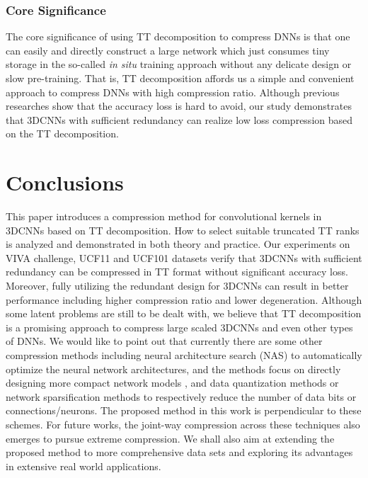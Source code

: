 \documentclass[a4paper,fleqn]{cas-dc}
\begin{document}
\subsubsection{Core Significance}\quad

The core significance of using TT decomposition to compress DNNs is that one can easily and directly construct a large network which just consumes tiny storage in the so-called \emph{in situ} training approach \citep{Alibart_2013_ExInSitu} without any delicate design or slow pre-training. That is, TT decomposition affords us a simple and convenient approach to compress DNNs with high compression ratio. Although previous researches \citep{Novikov_2015_TT,Huang_2018_TTCNN,Su_2018_TTCNN,Garipov_2016_TTCNN,Tjandra_2017_TTRNN1,Tjandra_2018_TTRNN2} show that the accuracy loss is hard to avoid, our study demonstrates that 3DCNNs with sufficient redundancy can realize low loss compression based on the TT decomposition.




\section{Conclusions}\label{sec:Con}
This paper introduces a compression method for convolutional kernels in 3DCNNs based on TT decomposition. How to select suitable truncated TT ranks is analyzed and demonstrated in both theory and practice. Our experiments on VIVA challenge, UCF11 and UCF101 datasets verify that 3DCNNs with sufficient redundancy can be compressed in TT format without significant accuracy loss. Moreover, fully utilizing the redundant design for 3DCNNs can result in better performance including higher compression ratio and lower degeneration. Although some latent problems are still to be dealt with, we believe that TT decomposition is a promising approach to compress large scaled 3DCNNs and even other types of DNNs. We would like to point out that currently there are some other compression methods including neural architecture search (NAS) \citep{Zoph_2018_NAS} to automatically optimize the neural network architectures, and the methods focus on directly designing more compact network models \citep{Zhang_2018_ShuffleNet}, and data quantization methods \citep{Wu_2018_WAGE} or network sparsification \citep{Zhu_2018_PruneOrNot} methods to respectively reduce the number of data bits or connections/neurons. The proposed method in this work is perpendicular to these schemes. For future works, the joint-way compression across these techniques also emerges to pursue extreme compression. We shall also aim at extending the proposed method to more comprehensive data sets and exploring its advantages in extensive real world applications.
\end{document}
